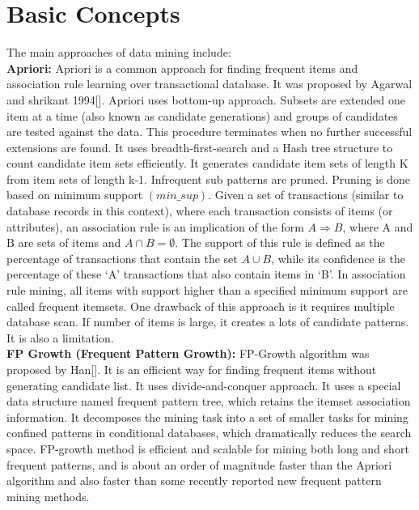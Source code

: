\section{Basic Concepts}
The main approaches of data mining include:\\
\textbf{Apriori:}
Apriori is a common approach for finding frequent items and association rule learning over transactional database. It was proposed by Agarwal and shrikant 1994[]. Apriori uses bottom-up approach. 
Subsets are extended one item at a time (also known as candidate generations) and groups of candidates are tested against the data. This procedure terminates when no further successful extensions 
are found. It uses breadth-first-search and a Hash tree structure to count candidate item sets efficiently. It generates candidate item sets of length K from item sets of length k-1. Infrequent 
sub patterns are pruned. Pruning is done based on minimum support $(min\_sup)$. Given a set of transactions (similar to database records in this context), where each transaction consists of
items (or attributes), an association rule is an implication of the form $A\Rightarrow B$, where A and B are sets of items and $A \cap B = \emptyset$. The support of this rule is defined as the percentage of transactions 
that contain the set $A \cup B$, while its confidence is the percentage of these ‘A’ transactions that also contain items in ‘B’. In association rule mining, all items with support higher than a 
specified minimum support are called frequent itemsets. One drawback of this approach is it requires multiple database scan. If number of items is large, it creates a lots of candidate patterns. 
It is also a limitation. \\
%
\textbf{FP Growth (Frequent Pattern Growth):}
FP-Growth algorithm was proposed by Han[]. It is an efficient way for finding frequent items without generating candidate list. It uses divide-and-conquer approach. It uses a special data structure 
named frequent pattern tree, which retains the itemset association information. It decomposes the mining task into a set of smaller tasks for mining confined patterns in conditional databases, 
which dramatically reduces the search space. FP-growth method is efficient and scalable for mining both long and short frequent patterns, and is about an order of magnitude faster than the Apriori 
algorithm and also faster than some recently reported new frequent pattern mining methods.\\

